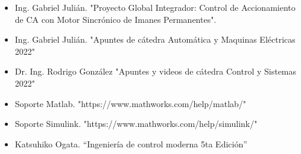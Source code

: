 \documentclass{article}
\begin{document}
\begin{itemize}
    \item Ing. Gabriel Julián. "Proyecto Global Integrador: Control de Accionamiento de CA con Motor Sincrónico de Imanes Permanentes".
    \item Ing. Gabriel Julián. "Apuntes de cátedra Automática y Maquinas Eléctricas 2022"
    \item Dr. Ing. Rodrigo González "Apuntes y videos de cátedra Control y Sistemas 2022"
    \item Soporte Matlab. "https://www.mathworks.com/help/matlab/"
    \item Soporte Simulink. "https://www.mathworks.com/help/simulink/"
    \item Katsuhiko Ogata. “Ingeniería de control moderna 5ta Edición”
  \end{itemize}

\label{LastPage}    
\end{document}
